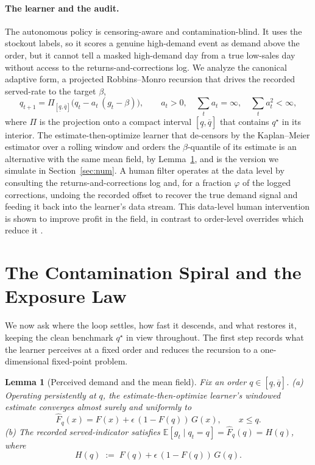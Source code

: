 \documentclass[11pt]{article}
\theoremstyle{plain}
\newtheorem{lemma}{Lemma}
\begin{document}
\paragraph{The learner and the audit.}
The autonomous policy is censoring-aware and contamination-blind. It uses the
stockout labels, so it scores a genuine high-demand event as demand above the order,
but it cannot tell a masked high-demand day from a true low-sales day without
access to the returns-and-corrections log. We analyze the canonical adaptive form,
a projected Robbins--Monro recursion that drives the recorded served-rate to the
target $\beta$,
\begin{equation}\label{eq:rm}
  q_{t+1}=\Pi_{[\underline q,\overline q]}\!\big(q_t-a_t\,(g_t-\beta)\big),
  \qquad a_t>0,\quad \textstyle\sum_t a_t=\infty,\quad \sum_t a_t^2<\infty,
\end{equation}
where $\Pi$ is the projection onto a compact interval $[\underline q,\overline q]$
that contains $q^\star$ in its interior. The estimate-then-optimize learner that
de-censors by the Kaplan--Meier estimator over a rolling window and orders the
$\beta$-quantile of its estimate is an alternative with the same mean field, by
Lemma~\ref{lem:mf}, and is the version we simulate in Section~\ref{sec:num}. A human
filter operates at the data level by consulting the returns-and-corrections log and,
for a fraction $\varphi$ of the logged corrections, undoing the recorded offset to
recover the true demand signal and feeding it back into the learner's data stream.
This data-level human intervention is shown to improve profit in the field, in
contrast to order-level overrides which reduce it \citep{kesavan2025judgmental}.

\section{The Contamination Spiral and the Exposure Law}\label{sec:law}

We now ask where the loop settles, how fast it descends, and what restores it,
keeping the clean benchmark $q^\star$ in view throughout. The first step records
what the learner perceives at a fixed order and reduces the recursion to a
one-dimensional fixed-point problem.

\begin{lemma}[Perceived demand and the mean field]\label{lem:mf}
Fix an order $q\in[\underline q,\overline q]$.
\textup{(a)} Operating persistently at $q$, the estimate-then-optimize learner's
windowed estimate converges almost surely and uniformly to
\begin{equation}\label{eq:Fhat}
  \widehat F_q(x)=F(x)+\epsilon\,(1-F(q))\,G(x),\qquad x\le q .
\end{equation}
\textup{(b)} The recorded served-indicator satisfies
$\mathbb E[g_t\mid q_t=q]=\widehat F_q(q)=H(q)$, where
\begin{equation}\label{eq:H}
  H(q)\;:=\;F(q)+\epsilon\,(1-F(q))\,G(q).
\end{equation}
\end{lemma}
\end{document}
